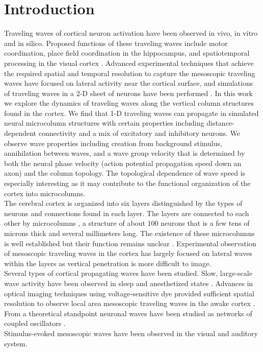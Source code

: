 \documentclass[a4paper,11pt]{article}
\begin{document}
\section{Introduction} 
Traveling waves of cortical neuron activation have been observed in vivo, in vitro and in silico. 
Proposed functions of these traveling waves include motor coordination, place field coordination in the hippocampus, and spatiotemporal processing in the visual cortex \cite{muller2018}. 
Advanced experimental techniques that achieve the required spatial and temporal resolution \cite{shoham1999} to capture the mesoscopic traveling waves have focused on lateral activity near the cortical surface, and simulations of traveling waves in a 2-D sheet of neurons have been performed \cite{keane2015}. 
In this work we explore the dynamics of traveling waves along the vertical column structures found in the cortex.
We find that 1-D traveling waves can propagate in simulated neural microcolumn structures with certain properties including distance-dependent connectivity and a mix of excitatory and inhibitory neurons. 
We observe wave properties including creation from background stimulus, annihilation between waves, and a wave group velocity that is determined by both the neural phase velocity (action potential propagation speed down an axon) and the column topology. 
The topological dependence of wave speed is especially interesting as it may contribute to the functional organization of the cortex into microcolumns.
\\
The cerebral cortex is organized into six layers distinguished by the types of neurons and connections found in each layer.
The layers are connected to each other by microcolumns \cite{cruz2005}, a structure of about 100 neurons that is a few tens of microns thick and several millimeters long.
The existence of these microcolumns is well established but their function remains unclear \cite{horton2005}. 
Experimental observation of mesoscopic traveling waves in the cortex has largely focused on lateral waves within the layers \cite{muller2018} as vertical penetration is more difficult to image.
\\
Several types of cortical propagating waves have been studied.
Slow, large-scale wave activity have been observed in sleep and anesthetized states \cite{muller2018}.
Advances in optical imaging techniques using voltage-sensitive dye provided sufficient spatial resolution to observe local area mesoscopic traveling waves in the awake cortex \cite{wu2008}.
From a theoretical standpoint neuronal waves have been studied as networks of coupled oscillators \cite{ermentrout2001}. 
\\
Stimulus-evoked mesoscopic waves have been observed in the visual and auditory system. 
\end{document}
